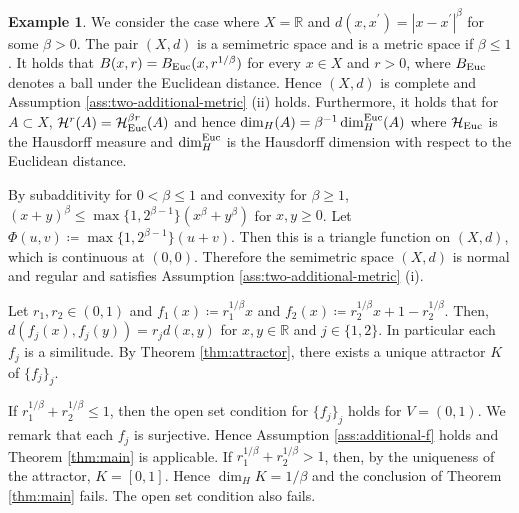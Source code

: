 \documentclass[a4paper, reqno, 11pt]{amsart}
\theoremstyle{definition}
\newtheorem{Exa}[Thm]{Example}
\begin{document}
\begin{Exa}
We consider the case where $X = \mathbb{R}$ and $d(x, x^{\prime}) = |x-x^{\prime}|^{\beta}$ for some $\beta > 0$. 
The pair $(X,d)$ is a  semimetric space and is a metric space if $\beta \le 1$. 
It holds that $B(x,r) = B_{\textup{Euc}}(x,r^{1/\beta})$ for every $x \in X$ and $r > 0$, where $B_{\textup{Euc}}$ denotes a ball  under the Euclidean distance. 
Hence $(X,d)$ is complete and Assumption \ref{ass:two-additional-metric} (ii) holds.
Furthermore, it holds that for $A \subset X$, 
$\mathcal{H}^r (A) = \mathcal{H}^{\beta r}_{\textup{Euc}}(A)$ and hence $\dim_H (A) = \beta^{-1} \dim_H^{\textup{Euc}} (A)$
where $\mathcal{H}_{\textup{Euc}}$ is the Hausdorff measure and $\dim_H^{\textup{Euc}}$ is the Hausdorff dimension with respect to the Euclidean distance. 


By subadditivity for $0 < \beta \le 1$ and convexity for $\beta \ge 1$, 
$(x+ y)^{\beta} \le \max\{1,2^{\beta -1}\} (x^{\beta} + y^{\beta})$ for $x, y \ge 0$. 
Let $\Phi  (u,v) \coloneqq \max\{1,2^{\beta-1}\} (u+v)$. 
Then this is a triangle function on $(X,d)$, which is continuous at $(0,0)$. 
Therefore the semimetric space $(X,d)$ is normal and regular and satisfies Assumption \ref{ass:two-additional-metric} (i). 

Let $r_1, r_2 \in (0,1)$ and $f_1 (x) \coloneqq r_1^{1/\beta} x$ and $f_2 (x) \coloneqq r_2^{1/\beta} x + 1 - r_2^{1/\beta}$. 
Then, $d(f_j (x), f_j (y)) = r_j d(x,y)$ for $x, y \in \mathbb{R}$ and $ j \in \{1,2\}$. 
In particular each $f_j$ is a similitude. 
By Theorem \ref{thm:attractor}, there exists a unique attractor $K$ of $\{f_j\}_j$. 


If $r_1^{1/\beta} + r_2^{1/\beta}  \le 1$, then the open set condition for $\{f_j\}_j$  holds for $V = (0,1)$. 
We remark that each $f_j$ is surjective. 
Hence Assumption \ref{ass:additional-f} holds and Theorem \ref{thm:main} is applicable. 
If $r_1^{1/\beta} + r_2^{1/\beta} > 1$, then, by the uniqueness of the attractor, $K = [0,1]$. 
Hence $\dim_H K = 1/\beta$ and the conclusion of Theorem \ref{thm:main} fails. 
The open set condition also fails.
\end{Exa}
\end{document}
